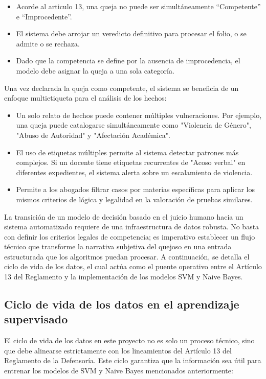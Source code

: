 \begin{itemize}
    \item Acorde al articulo 13, una queja no puede ser simultáneamente “Competente” e “Improcedente”.
    \item El sistema debe arrojar un veredicto definitivo para procesar el folio, o se admite o se rechaza.
    \item Dado que la competencia se define por la ausencia de improcedencia, el modelo debe asignar la queja a una sola categoría.
\end{itemize}

Una vez declarada la queja como competente, el sistema se beneficia de un enfoque multietiqueta para el análisis de los hechos:
\begin{itemize}
    \item Un solo relato de hechos puede contener múltiples vulneraciones. Por ejemplo, una queja puede catalogarse simultáneamente como "Violencia de Género", "Abuso de Autoridad" y "Afectación Académica".
    \item El uso de etiquetas múltiples permite al sistema detectar patrones más complejos. Si un docente tiene etiquetas recurrentes de "Acoso verbal" en diferentes expedientes, el sistema alerta sobre un escalamiento de violencia.
    \item Permite a los abogados filtrar casos por materias específicas para aplicar los mismos criterios de lógica y legalidad en la valoración de pruebas similares.
\end{itemize}

La transición de un modelo de decisión basado en el juicio humano hacia un sistema automatizado requiere de una infraestructura de datos robusta. No basta con definir los criterios legales de competencia; es imperativo establecer un flujo técnico que transforme la narrativa subjetiva del quejoso en una entrada estructurada que los algoritmos puedan procesar. A continuación, se detalla el ciclo de vida de los datos, el cual actúa como el puente operativo entre el Artículo 13 del Reglamento y la implementación de los modelos SVM y Naive Bayes.

\subsection{Ciclo de vida de los datos en el aprendizaje supervisado}

El ciclo de vida de los datos en este proyecto no es solo un proceso técnico, sino que debe alinearse estrictamente con los lineamientos del Artículo 13 del Reglamento de la Defensoría. Este ciclo garantiza que la información sea útil para entrenar los modelos de SVM y Naive Bayes mencionados anteriormente:

